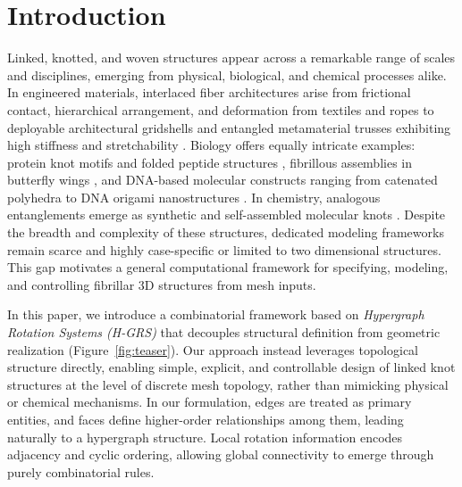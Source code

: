 \documentclass[acmtog,anonymous,review]{acmart}
\begin{document}
\begin{figure}[htb!]
    \label{fig:2_mantwist}
\end{figure}



\section{Introduction}
\label{sec:intro}

Linked, knotted, and woven structures appear across a remarkable range of scales and disciplines, emerging from physical, biological, and chemical processes alike. In engineered materials, interlaced fiber architectures arise from frictional contact, hierarchical arrangement, and deformation from textiles and ropes \citep{knittel2020modelling,niu2025geometric,singal2024programming} to deployable architectural gridshells \citep{yang2025topologicalwovennodes,liu2025doublelayeredegridshells} and entangled metamaterial trusses exhibiting high stiffness and stretchability \citep{surjadi2025doublenetwork,moestopo2023knots}. Biology offers equally intricate examples: protein knot motifs and folded peptide structures \citep{craik2001cystine}, fibrillous assemblies in butterfly wings \citep{jessop2025butterfly}, and DNA-based molecular constructs ranging from catenated polyhedra \citep{zhang1994dnatroctahedron} to DNA origami nanostructures \citep{glaser2021dnananostructures}. In chemistry, analogous entanglements emerge as synthetic and self-assembled molecular knots \citep{horner2016knot,fielden2017molecular,forgan2011chemical}. Despite the breadth and complexity of these structures, dedicated modeling frameworks remain scarce and highly case-specific\citep{carton2026threedwovendesign} or limited to two dimensional structures\citep{sonia2026constructionperiodic}. This gap motivates a general computational framework for specifying, modeling, and controlling fibrillar 3D structures from mesh inputs.

In this paper, we introduce a combinatorial framework based on \emph{Hypergraph Rotation Systems (H-GRS)} that decouples structural definition from geometric realization (Figure~\ref{fig:teaser}). Our approach instead leverages topological structure directly, enabling simple, explicit, and controllable design of linked knot structures at the level of discrete mesh topology, rather than mimicking physical or chemical mechanisms. In our formulation, edges are treated as primary entities, and faces define higher-order relationships among them, leading naturally to a hypergraph structure. Local rotation information encodes adjacency and cyclic ordering, allowing global connectivity to emerge through purely combinatorial rules.
\end{document}
